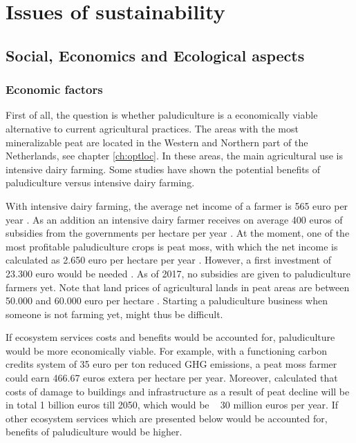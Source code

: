 \documentclass[a4paper,12pt]{scrbook}
\begin{document}
\chapter{Issues of sustainability} \label{ch:sust}

\section{Social, Economics and Ecological aspects}

\subsection{Economic factors}
First of all, the question is whether paludiculture is a economically viable alternative to current agricultural practices. The areas with the most mineralizable peat are located in the Western and Northern part of the Netherlands, see chapter \ref{ch:optloc}. In these areas, the main agricultural use is intensive dairy farming. Some studies have shown the potential benefits of paludiculture versus intensive dairy farming. 

With intensive dairy farming, the average net income of a farmer is 565 euro per year \citep{van2013rewetting}. As an addition an intensive dairy farmer receives on average 400 euros of subsidies from the governments per hectare per year \citep{van2013rewetting}. At the moment, one of the most profitable paludiculture crops is peat moss, with which the net income is calculated as 2.650 euro per hectare per year \citep{van2013rewetting}. However, a first investment of 23.300 euro would be needed \citep{van2013rewetting}. As of 2017, no subsidies are given to paludiculture farmers yet. Note that land prices of agricultural lands in peat areas are between 50.000 and 60.000 euro per hectare \citep{}. Starting a paludiculture business when someone is not farming yet, might thus be difficult.

If ecosystem services costs and benefits would be accounted for, paludiculture would be more economically viable. For example, with a functioning carbon credits system of 35 euro per ton reduced GHG emissions, a peat moss farmer could earn 466.67 euros extera per hectare per year. Moreover, \citet{van2016dalende} calculated that costs of damage to buildings and infrastructure as a result of peat decline will be in total 1 billion euros till 2050, which would be ~ 30 million euros per year. If other ecosystem services which are presented below would be accounted for, benefits of paludiculture would be higher.
\end{document}
